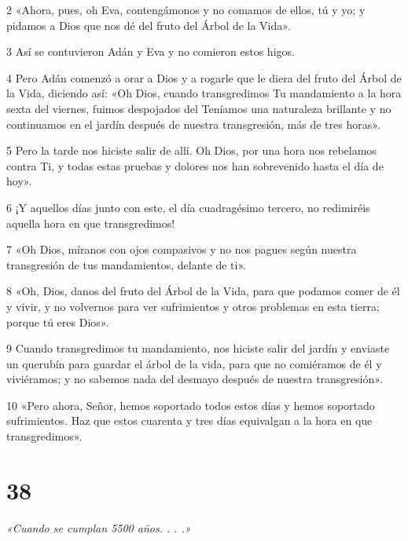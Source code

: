 \par 2 «Ahora, pues, oh Eva, contengámonos y no comamos de ellos, tú y yo; y pidamos a Dios que nos dé del fruto del Árbol de la Vida».

\par 3 Así se contuvieron Adán y Eva y no comieron estos higos.

\par 4 Pero Adán comenzó a orar a Dios y a rogarle que le diera del fruto del Árbol de la Vida, diciendo así: «Oh Dios, cuando transgredimos Tu mandamiento a la hora sexta del viernes, fuimos despojados del Teníamos una naturaleza brillante y no continuamos en el jardín después de nuestra transgresión, más de tres horas».

\par 5 Pero la tarde nos hiciste salir de allí. Oh Dios, por una hora nos rebelamos contra Ti, y todas estas pruebas y dolores nos han sobrevenido hasta el día de hoy».

\par 6 ¡Y aquellos días junto con este, el día cuadragésimo tercero, no redimiréis aquella hora en que transgredimos!

\par 7 «Oh Dios, míranos con ojos compasivos y no nos pagues según nuestra transgresión de tus mandamientos, delante de ti».

\par 8 «Oh, Dios, danos del fruto del Árbol de la Vida, para que podamos comer de él y vivir, y no volvernos para ver sufrimientos y otros problemas en esta tierra; porque tú eres Dios».

\par 9 Cuando transgredimos tu mandamiento, nos hiciste salir del jardín y enviaste un querubín para guardar el árbol de la vida, para que no comiéramos de él y viviéramos; y no sabemos nada del desmayo después de nuestra transgresión».

\par 10 «Pero ahora, Señor, hemos soportado todos estos días y hemos soportado sufrimientos. Haz que estos cuarenta y tres días equivalgan a la hora en que transgredimos».

\chapter{38}

\par \textit{«Cuando se cumplan 5500 años. . . .»}

